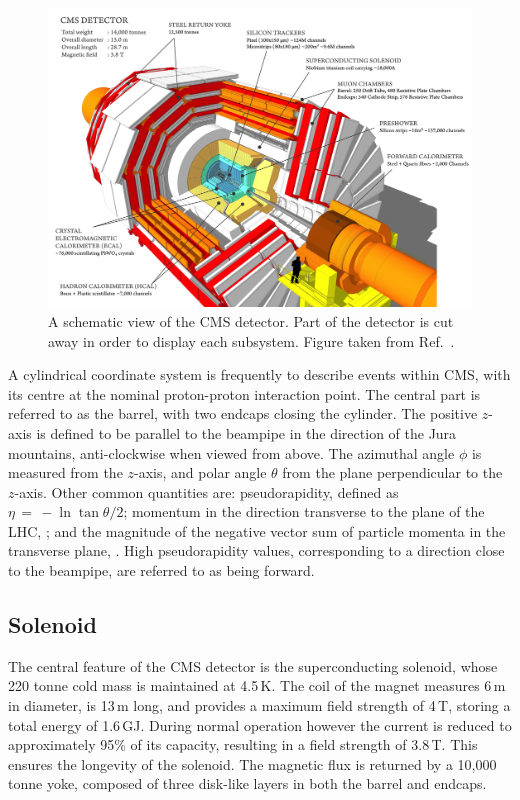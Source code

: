 \begin{figure}[h!]
  \centering
  \includegraphics[width=\textwidth]{Figures/Detector/CMSschematic.png}
  \caption[A schematic view of the CMS detector.]
  {A schematic view of the CMS detector.
  Part of the detector is cut away in order to display each subsystem.
  Figure taken from Ref.~\cite{SketchUp}.}
  \label{fig:detector_CMSschematic}
\end{figure}

A cylindrical coordinate system is frequently to describe events within CMS, with its centre at the nominal proton-proton interaction point.
The central part is referred to as the barrel, with two endcaps closing the cylinder.
The positive $z$-axis is defined to be parallel to the beampipe in the direction of the Jura mountains, anti-clockwise when viewed from above.
The azimuthal angle $\phi$ is measured from the $z$-axis, and polar angle $\theta$ from the plane perpendicular to the $z$-axis.
Other common quantities are: pseudorapidity, defined as $\eta \, = \, -\ln{\tan{\theta/2}}$; 
momentum in the direction transverse to the plane of the LHC, \pt; 
and the magnitude of the negative vector sum of particle momenta in the transverse plane, \met.
High pseudorapidity values, corresponding to a direction close to the beampipe, are referred to as being forward.

\subsection{Solenoid}

The central feature of the CMS detector is the superconducting solenoid, whose 220 tonne cold mass is maintained at 4.5\,K.%
The coil of the magnet measures 6\,m in diameter, is 13\,m long, and provides a maximum field strength of 4\,T, storing a total energy of 1.6\,GJ.
During normal operation however the current is reduced to approximately 95\% of its capacity, resulting in a field strength of 3.8\,T.
This ensures the longevity of the solenoid.
The magnetic flux is returned by a 10,000 tonne yoke, composed of three disk-like layers in both the barrel and endcaps.

